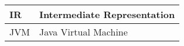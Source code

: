 \abbreviations
\begin{center}
	\renewcommand{\arraystretch}{1.5}
	\begin{longtable}{| l @{\qquad} | l |}
	\hline
	IR 			& Intermediate Representation 	\\ \hline
	JVM 		& Java Virtual Machine 			\\ \hline
	\end{longtable}
\end{center}
